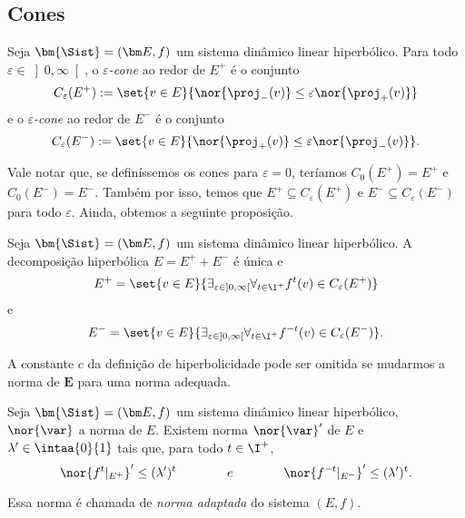\subsection{Cones}

\begin{definition}
Seja $\bm{\Sist}=(\bm E,f)$ um sistema dinâmico linear hiperbólico. Para todo $\varepsilon \in \left] 0,\infty \right[$, o \emph{$\varepsilon$-cone} ao redor de $E^+$ é o conjunto
	\begin{equation*}
	C_\varepsilon(E^+) := \set{v \in E}{\nor{\proj_-(v)} \leq \varepsilon\nor{\proj_+(v)}}
	\end{equation*}
e o \emph{$\varepsilon$-cone} ao redor de $E^-$ é o conjunto
	\begin{equation*}
	C_\varepsilon(E^-) := \set{v \in E}{\nor{\proj_+(v)} \leq \varepsilon\nor{\proj_-(v)}}.
	\end{equation*}
\end{definition}

Vale notar que, se definíssemos os cones para $\varepsilon=0$, teríamos $C_0(E^+) = E^+$ e $C_0(E^-) = E^-$. Também por isso, temos que $E^+ \subseteq C_\varepsilon(E^+)$ e $E^- \subseteq C_\varepsilon(E^-)$ para todo $\varepsilon$. Ainda, obtemos a seguinte proposição.

\begin{proposition}
Seja $\bm{\Sist}=(\bm E,f)$ um sistema dinâmico linear hiperbólico. A decomposição hiperbólica $E = E^+ + E^-$ é única e
	\begin{equation*}
	E^+ = \set{v \in E}{\exists_{\varepsilon \in \left] 0,\infty \right[} \forall_{t \in \I^+} f^t(v) \in C_\varepsilon(E^+)}
	\end{equation*}
e
	\begin{equation*}
	E^- = \set{v \in E}{\exists_{\varepsilon \in \left] 0,\infty \right[} \forall_{t \in \I^+} f^{-t}(v) \in C_\varepsilon(E^-)}.
	\end{equation*}
\end{proposition}

A constante $c$ da definição de hiperbolicidade pode ser omitida se mudarmos a norma de $\bm E$ para uma norma adequada.

\begin{proposition}
Seja $\bm{\Sist}=(\bm E,f)$ um sistema dinâmico linear hiperbólico, $\nor{\var}$ a norma de $E$. Existem norma $\nor{\var}'$ de $E$ e $\lambda' \in \intaa{0}{1}$ tais que, para todo $t \in \I^+$,
	\begin{equation*}
	\nor{f^t|_{E^+}}' \leq (\lambda')^t \qquad\qquad e \qquad\qquad \nor{f^{-t}|_{E^-}}' \leq (\lambda')^t.
	\end{equation*}
\end{proposition}

Essa norma é chamada de \emph{norma adaptada} do sistema $(E,f)$.












